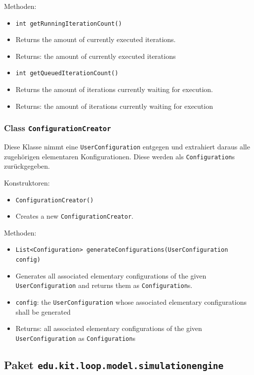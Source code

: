 \documentclass[parskip=full,11pt]{scrartcl}
\begin{document}
Methoden:
\begin{itemize}\itemsep -10pt
\item \texttt{int getRunningIterationCount()}
\item[] Returns the amount of currently executed iterations.
\item[] Returns: the amount of currently executed iterations

\item \texttt{int getQueuedIterationCount()}
\item[] Returns the amount of iterations currently waiting for execution.
\item[] Returns: the amount of iterations currently waiting for execution
\end{itemize}

\subsubsection{Class \texttt{ConfigurationCreator}}
Diese Klasse nimmt eine \texttt{UserConfiguration} entgegen und extrahiert daraus alle zugehörigen elementaren Konfigurationen. Diese werden als \texttt{Configuration}s zurückgegeben.

Konstruktoren:
\begin{itemize}\itemsep -10pt
\item \texttt{ConfigurationCreator()}
\item[] Creates a new \texttt{ConfigurationCreator}.
\end{itemize}

Methoden:
\begin{itemize}\itemsep -10pt
\item \texttt{List<Configuration> generateConfigurations(UserConfiguration config)}
\item[] Generates all associated elementary configurations of the given \texttt{UserConfiguration} and returns them as \texttt{Configuration}s.
\item[] \texttt{config}: the \texttt{UserConfiguration} whose associated elementary configurations shall be generated
\item[] Returns: all associated elementary configurations of the given \texttt{UserConfiguration} as \texttt{Configuration}s
\end{itemize}

\subsection{Paket \texttt{edu.kit.loop.model.simulationengine}}
\end{document}

